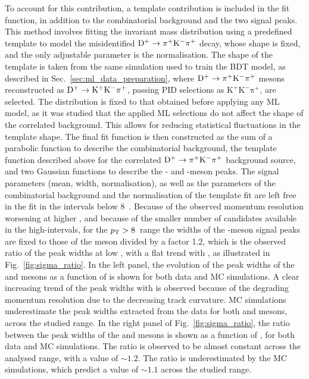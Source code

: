 To account for this contribution, a template contribution is included in the fit function, in addition to the combinatorial background and the two signal peaks. This method involves fitting the invariant mass distribution using a predefined template to model the misidentified $\mathrm{D^+}\rightarrow\mathrm{\pi^+K^-\pi^+}$ decay, whose shape is fixed, and the only adjustable parameter is the normalisation. The shape of the template is taken from the same simulation used to train the BDT model, as described in Sec.~\ref{sec:ml_data_preparation}, where $\mathrm{D^+}\rightarrow\mathrm{\pi^+K^-\pi^+}$ mesons reconstructed as $\mathrm{D^+}\rightarrow\mathrm{K^+K^-\pi^+}$, passing PID selections as $\mathrm{K^+K^-\pi^+}$, are selected. The distribution is fixed to that obtained before applying any ML model, as it was studied that the applied ML selections do not affect the shape of the correlated background. This allows for reducing statistical fluctuations in the template shape. The final fit function is then constructed as the sum of a parabolic function to describe the combinatorial background, the template function described above for the correlated $\mathrm{D^+}\rightarrow\mathrm{\pi^+K^-\pi^+}$ background source, and two Gaussian functions to describe the \ds- and \dpl-meson peaks. The signal parameters (mean, width, normalisation), as well as the parameters of the combinatorial background and the normalisation of the template fit are left free in the fit in the \pt intervals below 8~\gevc. Because of the observed momentum resolution worsening at higher \pt, and because of the smaller number of candidates available in the high-\pt intervals, for the $p_\mathrm{T}>8$~\gevc range the widths of the \dpl-meson signal peaks are fixed to those of the \ds meson divided by a factor 1.2, which is the observed ratio of the peak widths at low \pt, with a flat trend with \pt, as illustrated in Fig.~\ref{fig:sigma_ratio}. In the left panel, the evolution of the peak widths of the \ds and \dpl mesons as a function of \pt is shown for both data and MC simulations. A clear increasing trend of the peak widths with \pt is observed because of the degrading momentum resolution due to the decreasing track curvature. MC simulations underestimate the peak widths extracted from the data for both \ds and \dpl mesons, across the studied \pt range. In the right panel of Fig.~\ref{fig:sigma_ratio}, the ratio between the peak widths of the \ds and \dpl mesons is shown as a function of \pt, for both data and MC simulations. The ratio is observed to be almost constant across the analysed \pt range, with a value of $\sim 1.2$. The ratio is underestimated by the MC simulations, which predict a value of $\sim 1.1$ across the studied \pt range.

